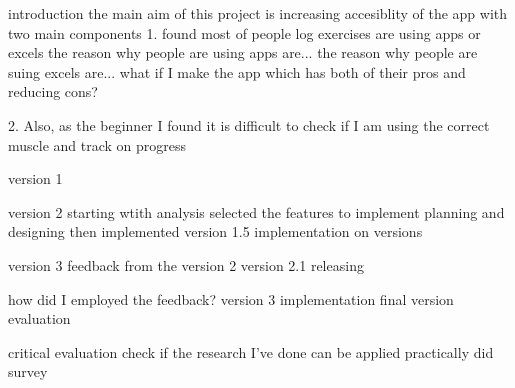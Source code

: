 introduction
the main aim of this project is increasing accesiblity of the app
with two main components 
1.
found most of people log exercises are using apps or excels
the reason why people are using apps are...
the reason why people are suing excels are...
what if I make the app which has both of their pros and reducing cons?

2.
Also, as the beginner I found it is difficult to check if I am using the correct muscle and track on progress


version 1


version 2
starting wtith analysis
selected the features to implement 
planning and designing
then implemented version 1.5
implementation on versions 

version 3
feedback from the version 2
version 2.1 releasing

how did I employed the feedback?
version 3 implementation
final version evaluation


critical evaluation
check if the research I've done can be applied practically
did survey



